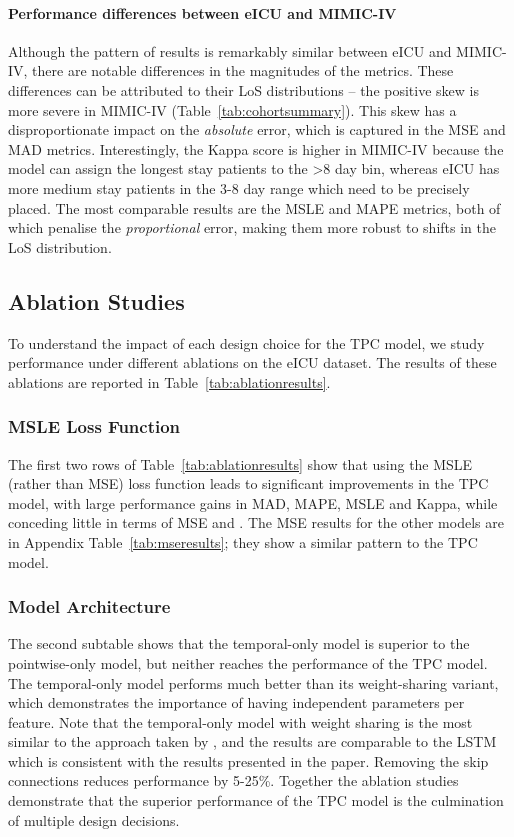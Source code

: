 \documentclass[sigconf]{acmart}
\begin{document}
\paragraph{Performance differences between eICU and MIMIC-IV} Although the pattern of results is remarkably similar between eICU and MIMIC-IV, there are notable differences in the magnitudes of the metrics. These differences can be attributed to their LoS distributions -- the positive skew is more severe in MIMIC-IV (Table~\ref{tab:cohortsummary}). This skew has a disproportionate impact on the \emph{absolute} error, which is captured in the MSE and MAD metrics. Interestingly, the Kappa score is higher in MIMIC-IV because the model can assign the longest stay patients to the >8 day bin, whereas eICU has more medium stay patients in the 3-8 day range which need to be precisely placed. The most comparable results are the MSLE and MAPE metrics, both of which penalise the \emph{proportional} error, making them more robust to shifts in the LoS distribution. 

\subsection{Ablation Studies}
To understand the impact of each design choice for the TPC model, we study performance under different ablations on the eICU dataset. The results of these ablations are reported in Table~\ref{tab:ablationresults}.

\subsubsection{MSLE Loss Function}
The first two rows of Table~\ref{tab:ablationresults} show that using the MSLE (rather than MSE) loss function leads to significant improvements in the TPC model, with large performance gains in MAD, MAPE, MSLE and Kappa, while conceding little in terms of MSE and . The MSE results for the other models are in Appendix Table~\ref{tab:mseresults}; they show a similar pattern to the TPC model.

\subsubsection{Model Architecture}
The second subtable shows that the temporal-only model is superior to the pointwise-only model, but neither reaches the performance of the TPC model. The temporal-only model performs much better than its weight-sharing variant, which demonstrates the importance of having independent parameters per feature. Note that the temporal-only model with weight sharing is the most similar to the approach taken by \citet{sontag}, and the results are comparable to the LSTM which is consistent with the results presented in the paper. Removing the skip connections reduces performance by 5-25\%. Together the ablation studies demonstrate that the superior performance of the TPC model is the culmination of multiple design decisions.
\end{document}
